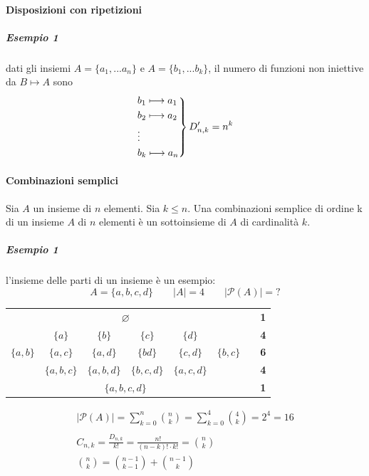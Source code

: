 \documentclass[italian]{article}
\newcommand{\combs}[2]{\text{$C_{#1,#2}$}}
\newcommand{\disps}[2]{\text{$D_{#1,#2}$}}
\newcommand{\dispr}[2]{\text{$D'_{#1,#2}$}}
\begin{document}
\paragraph{Disposizioni con ripetizioni}

\subparagraph{Esempio 1} dati gli insiemi $A = \{ a_1,...a_n \}$ e $A = \{ b_1,...b_k \}$, il numero di funzioni non iniettive da $B \longmapsto A$ sono
\begin{gather*}
	\begin{rcases*}
		b_1 \longmapsto a_1 \\
		b_2 \longmapsto a_2 \\
		\vdots \\
		b_k \longmapsto a_n
	\end{rcases*}
	\dispr{n}{k} = n^k
\end{gather*}


\paragraph{Combinazioni semplici}
Sia $A$ un insieme di $n$ elementi. Sia $k \leq n$. Una combinazioni semplice di ordine k di un insieme $A$ di $n$ elementi è un sottoinsieme di $A$ di cardinalità $k$.
\subparagraph{Esempio 1} l'insieme delle parti di un insieme è un esempio:
\[
	A = \{ a,b,c,d \} \qquad |A| = 4 \qquad |\mathcal{P}(A)| = ? 	 
\]
\begin{table}[h]
	\centering
	\begin{tabular}{ccccccll}
		&     & \multicolumn{2}{c}{$\varnothing$}    &     &    &  & \textbf{1} \\[3mm]
		& $\{ a \}$   & $\{ b \}$           & $\{ c \}$          & $\{ d \}$   &    &  & \textbf{4} \\[3mm]
		$\{ a,b \}$ & $\{ a,c \}$  & $\{ a,d \}$          & $\{ bd \}$         & $\{ c,d \}$  & $\{ b,c \}$ &  & \textbf{6} \\[3mm]
		& $\{ a,b,c \}$ & $\{ a,b,d \}$         & $\{ b,c,d \}$        & $\{ a,c,d \}$ &    &  & \textbf{4} \\[3mm]
		&     & \multicolumn{2}{c}{$\{ a,b,c,d \}$} &     &    &  & \textbf{1}
	\end{tabular}
\end{table}
\begin{gather*}
	|\mathcal{P}(A)| = \sum_{k=0}^{n} \binom{n}{k} = \sum_{k=0}^{4}\binom{4}{k} = 2^4 = 16\\\\
	\combs{n}{k} = \frac{\disps{n}{k}}{k!} = \frac{n!}{(n-k)!\cdot k!} = \binom{n}{k} \\
	\binom{n}{k} = \binom{n-1}{k-1} + \binom{n-1}{k}
\end{gather*}
\end{document}

